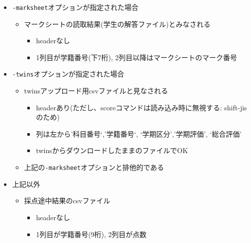 \begin{itemize}
\item \texttt{-marksheet}オプションが指定された場合

\begin{itemize}
\item マークシートの読取結果(学生の解答ファイル)とみなされる

\begin{itemize}
\item headerなし

\item 1列目が学籍番号(下7桁), 2列目以降はマークシートのマーク番号

\end{itemize}

\end{itemize}

\item \texttt{-twins}オプションが指定された場合

\begin{itemize}
\item twinsアップロード用csvファイルと見なされる

\begin{itemize}
\item headerあり(ただし、scoreコマンドは読み込み時に無視する: shift-jisのため)

\item 列は左から'科目番号`,'学籍番号`, `学期区分','学期評価', `総合評価'

\item twinsからダウンロードしたままのファイルでOK

\end{itemize}

\item 上記の\texttt{-marksheet}オプションと排他的である

\end{itemize}

\item 上記以外

\begin{itemize}
\item 採点途中結果のcsvファイル

\begin{itemize}
\item headerなし

\item 1列目が学籍番号(9桁), 2列目が点数

\end{itemize}

\end{itemize}

\end{itemize}


